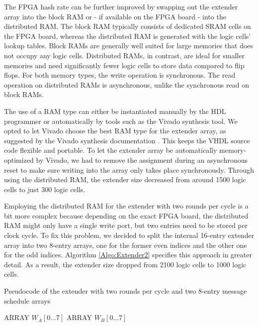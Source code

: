 The FPGA hash rate can be further improved by swapping out the extender array into the block RAM or - if available on the FPGA board - into the distributed RAM. The block RAM typically consists of dedicated SRAM cells on the FPGA board, whereas the distributed RAM is generated with the logic cells' lookup tables. Block RAMs are generally well suited for large memories that does not occupy any logic cells. Distributed RAMs, in contrast, are ideal for smaller memories and need significantly fewer logic cells to store data compared to flip flops. For both memory types, the write operation is synchronous. The read operation on distributed RAMs is asynchronous, unlike the synchronous read on block RAMs.

The use of a RAM type can either be instantiated manually by the HDL programmer or automatically by tools such as the Vivado synthesis tool. We opted to let Vivado choose the best RAM type for the extender array, as suggested by the Vivado synthesis documentation \cite{VivadoSynthesis}. This keeps the VHDL source code flexible and portable. To let the extender array be automatically memory-optimized by Vivado, we had to remove the assignment during an asynchronous reset to make sure writing into the array only takes place synchronously. Through using the distributed RAM, the extender size decreased from around 1500 logic cells to just 300 logic cells.

Employing the distributed RAM for the extender with two rounds per cycle is a bit more complex because depending on the exact FPGA board, the distributed RAM might only have a single write port, but two entries need to be stored per clock cycle.
To fix this problem, we decided to split the internal 16-entry extender array into two 8-entry arrays, one for the former even indices and the other one for the odd indices. Algorithm \ref{Algo:Extender2} specifies this approach in greater detail. As a result, the extender size dropped from 2100 logic cells to 1000 logic cells.

\begin{algorithm}[H]
\caption{Pseudocode of the extender with two rounds per cycle and two 8-entry message schedule arrays}
\label{Algo:Extender2}
\begin{algorithmic}[1]
    \State ARRAY $W_A[0 \dots 7]$
    \State ARRAY $W_B[0 \dots 7]$
        \Else
        \EndIf
        \State {}
    \EndFor
\end{algorithmic}
\end{algorithm}

